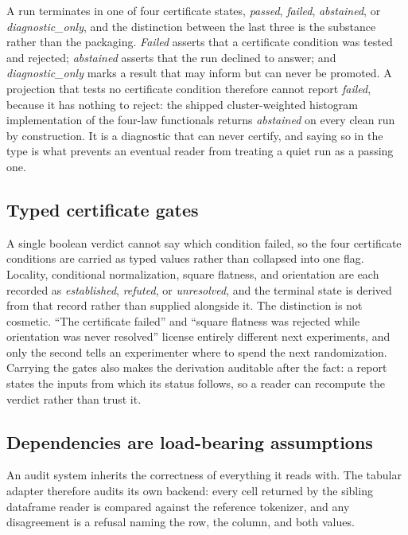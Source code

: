 \documentclass[11pt]{article}
\begin{document}
A run terminates in one of four certificate states, \emph{passed},
\emph{failed}, \emph{abstained}, or \emph{diagnostic\_only}, and the
distinction between the last three is the substance rather than the packaging.
\emph{Failed} asserts that a certificate condition was tested and rejected;
\emph{abstained} asserts that the run declined to answer; and
\emph{diagnostic\_only} marks a result that may inform but can never be
promoted. A projection that tests no certificate condition therefore cannot
report \emph{failed}, because it has nothing to reject: the shipped
cluster-weighted histogram implementation of the four-law functionals returns
\emph{abstained} on every clean run by construction. It is a diagnostic that
can never certify, and saying so in the type is what prevents an eventual
reader from treating a quiet run as a passing one.

\subsection{Typed certificate gates}

A single boolean verdict cannot say which condition failed, so the four
certificate conditions are carried as typed values rather than collapsed into
one flag. Locality, conditional normalization, square flatness, and orientation
are each recorded as \emph{established}, \emph{refuted}, or \emph{unresolved},
and the terminal state is derived from that record rather than supplied
alongside it. The distinction is not cosmetic. ``The certificate failed'' and
``square flatness was rejected while orientation was never resolved'' license
entirely different next experiments, and only the second tells an experimenter
where to spend the next randomization. Carrying the gates also makes the
derivation auditable after the fact: a report states the inputs from which its
status follows, so a reader can recompute the verdict rather than trust it.

\subsection{Dependencies are load-bearing assumptions}

An audit system inherits the correctness of everything it reads with. The
tabular adapter therefore audits its own backend: every cell returned by the
sibling dataframe reader is compared against the reference tokenizer, and any
disagreement is a refusal naming the row, the column, and both values.
\end{document}
